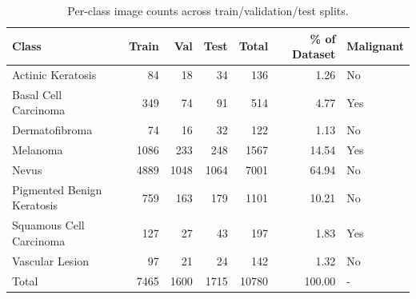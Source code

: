 \begin{table}
\caption{Per-class image counts across train/validation/test splits.}
\label{tab:table1_dataset_statistics}
\begin{tabular}{lrrrrrl}
\toprule
Class & Train & Val & Test & Total & \% of Dataset & Malignant \\
\midrule
Actinic Keratosis & 84 & 18 & 34 & 136 & 1.26 & No \\
Basal Cell Carcinoma & 349 & 74 & 91 & 514 & 4.77 & Yes \\
Dermatofibroma & 74 & 16 & 32 & 122 & 1.13 & No \\
Melanoma & 1086 & 233 & 248 & 1567 & 14.54 & Yes \\
Nevus & 4889 & 1048 & 1064 & 7001 & 64.94 & No \\
Pigmented Benign Keratosis & 759 & 163 & 179 & 1101 & 10.21 & No \\
Squamous Cell Carcinoma & 127 & 27 & 43 & 197 & 1.83 & Yes \\
Vascular Lesion & 97 & 21 & 24 & 142 & 1.32 & No \\
Total & 7465 & 1600 & 1715 & 10780 & 100.00 & - \\
\bottomrule
\end{tabular}
\end{table}

